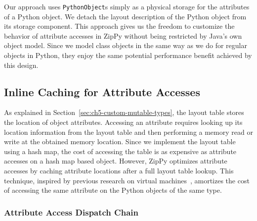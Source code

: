 Our approach uses \texttt{PythonObject}s simply as a physical storage for the attributes of a Python object.
We detach the layout description of the Python object from its storage component.
This approach gives us the freedom to customize the behavior of attribute accesses in ZipPy without being restricted by Java's own object model.
Since we model class objects in the same way as we do for regular objects in Python, they enjoy the same potential performance benefit achieved by this design.

\subsection{Inline Caching for Attribute Accesses}

As explained in Section~\ref{sec:ch5-custom-mutable-types}, the layout table stores the location of object attributes.
Accessing an attribute requires looking up its location information from the layout table and then performing a memory read or write at the obtained memory location.
Since we implement the layout table using a hash map, the cost of accessing the table is as expensive as attribute accesses on a hash map based object.
However, ZipPy optimizes attribute accesses by caching attribute locations after a full layout table lookup.
This technique, inspired by previous research on virtual machines~\cite{Deutsch1984, Holzle+1991, Brunthaler2010inca}, amortizes the cost of accessing the same attribute on the Python objects of the same type.

\subsubsection{Attribute Access Dispatch Chain}
\label{sec:ch5-attribute-access-dispatch-chain}

